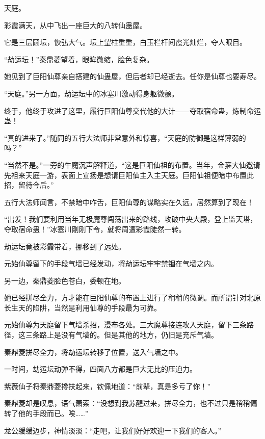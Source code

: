 
\begin{this_body}



天庭。

彩霞满天，从中飞出一座巨大的八转仙蛊屋。

它是三层圆坛，恢弘大气。坛上望柱重重，白玉栏杆间霞光灿烂，夺人眼目。

“劫运坛！”秦鼎菱望着，眼眸微缩，脸色复杂。

她见到了巨阳仙尊亲自搭建的仙蛊屋，但后者却已经逝去。任你是仙尊也要寿尽。

“天庭。”另一方面，劫运坛中的冰塞川激动得身躯微颤。

终于，他终于攻进了这里，履行巨阳仙尊交代他的大计——夺取宿命蛊，炼制命运蛊！

“真的进来了。”随同的五行大法师非常意外和惊喜，“天庭的防御是这样薄弱的吗？”

“当然不是。”一旁的牛魔沉声解释道，“这是巨阳仙祖的布置。当年，金箍大仙邀请先祖来天庭一游，表面上宣扬是想请巨阳仙主入主天庭。巨阳仙祖便暗中布置此招，留待今后。”

五行大法师闻言，不禁暗中咋舌，巨阳仙尊的谋略实在久远，居然算到了现在！

“出发！我们要利用当年无极魔尊闯荡出来的路线，攻破中央大殿，登上监天塔，夺取宿命蛊！”冰塞川刚刚下令，就将周遭彩霞陡然一转。

劫运坛竟被彩霞带着，挪移到了远处。

元始仙尊留下的手段气墙已经发动，将劫运坛牢牢禁锢在气墙之内。

另一边，秦鼎菱脸色苍白，委顿在地。

她已经拼尽全力，方才能在巨阳仙尊的布置上进行了稍稍的微调。而所谓针对北原长生天的陷阱，当然是利用仙尊的手段最为可靠。

元始仙尊为天庭留下气墙杀招，漫布各处。三大魔尊接连攻入天庭，留下三条路径，这三条路上是没有气墙的。但是其他的地方，仍旧是充斥气墙。

秦鼎菱拼尽全力，将劫运坛转移了位置，送入气墙之中。

一时间，劫运坛动弹不得，四面八方都是巨大无比的压迫力。

紫薇仙子将秦鼎菱搀扶起来，钦佩地道：“前辈，真是多亏了你！”

秦鼎菱却是叹息，语气萧索：“没想到我苏醒过来，拼尽全力，也不过只是稍稍偏转了他的手段而已。唉……”

龙公缓缓迈步，神情淡淡：“走吧，让我们好好欢迎一下我们的客人。”


\end{this_body}
